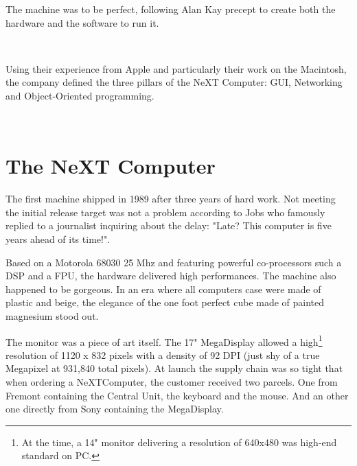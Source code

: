 \par
The machine was to be perfect, following Alan Kay precept to create both the hardware and the software to run it.\\
\par
{}\\
\par

Using their experience from Apple and particularly their work on the Macintosh, the company defined the three pillars of the NeXT Computer: GUI, Networking and Object-Oriented programming.\\
\par
{}\\

\par
\section{The NeXT Computer}
The first machine shipped in 1989 after three years of hard work. Not meeting the initial release target was not a problem according to Jobs who famously replied to a journalist inquiring about the delay: "Late? This computer is five years ahead of its time!".\\
\par
Based on a Motorola 68030 25 Mhz and featuring powerful co-processors such a DSP and a FPU, the hardware delivered high performances. The machine also happened to be gorgeous. In an era where all computers case were made of plastic and beige, the elegance of the one foot perfect cube made of painted magnesium stood out.\\
\par
{}


The monitor was a piece of art itself. The 17" MegaDisplay allowed a high\footnote{At the time, a 14" monitor delivering a resolution of 640x480 was high-end standard on PC.} resolution of 1120 x 832 pixels with a density of 92 DPI (just shy of a true Megapixel at 931,840 total pixels). At launch the supply chain was so tight that when ordering a NeXTComputer, the customer received two parcels. One from Fremont containing the Central Unit, the keyboard and the mouse. And an other one directly from Sony containing the MegaDisplay.




